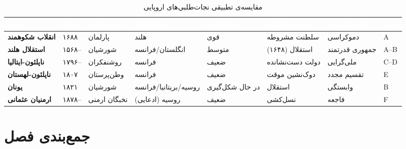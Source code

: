 \begin{landscape}
\begin{table}[htbp]
\centering
\caption{مقایسه‌ی تطبیقی نجات‌طلبی‌های اروپایی}\label{tab:ch08-european-comparative}
\begin{adjustbox}{max width=\linewidth}
\begin{tabular}{
  >{\raggedleft\arraybackslash\bfseries\small}p{2.5cm}
  >{\raggedleft\arraybackslash\small}p{1.5cm}
  >{\raggedleft\arraybackslash\small}p{2cm}
  >{\raggedleft\arraybackslash\small}p{2cm}
  >{\raggedleft\arraybackslash\small}p{2cm}
  >{\raggedleft\arraybackslash\small}p{2.5cm}
  >{\raggedleft\arraybackslash\small}p{2cm}
  >{\raggedleft\arraybackslash\small}p{1.5cm}}
\toprule
\rowcolor{PrimaryDeep}
\textcolor{white}{مورد} &
\textcolor{white}{سال} &
\textcolor{white}{دعوت‌کننده} &
\textcolor{white}{مداخله‌گر} &
\textcolor{white}{نهاد داخلی} &
\textcolor{white}{نتیجه‌ی اصلی} &
\textcolor{white}{پیامد بلندمدت} &
\textcolor{white}{طیف} \\
\midrule

انقلاب شکوهمند &
۱۶۸۸ &
پارلمان &
هلند &
\cellcolor{BgSuccess}قوی &
سلطنت مشروطه &
دموکراسی &
A \\
\rowcolor{NeutralLight}
استقلال هلند &
۱۵۶۸– &
شورشیان &
انگلستان/فرانسه &
\cellcolor{BgWarm}متوسط &
استقلال (۱۶۴۸) &
جمهوری قدرتمند &
A–B \\
ناپلئون-ایتالیا &
۱۷۹۶– &
روشنفکران &
فرانسه &
\cellcolor{BgFail}ضعیف &
دولت دست‌نشانده &
ملی‌گرایی &
C–D \\
\rowcolor{NeutralLight}
ناپلئون-لهستان &
۱۸۰۷ &
وطن‌پرستان &
فرانسه &
\cellcolor{BgFail}ضعیف &
دوک‌نشین موقت &
تقسیم مجدد &
E \\
یونان &
۱۸۲۱ &
شورشیان &
روسیه/بریتانیا/فرانسه &
\cellcolor{BgWarm}در حال شکل‌گیری &
استقلال &
وابستگی &
B \\
\rowcolor{NeutralLight}
ارمنیان عثمانی &
۱۸۷۸– &
نخبگان ارمنی &
روسیه (ادعایی) &
\cellcolor{BgFail}ضعیف &
نسل‌کشی &
فاجعه &
F \\

\bottomrule
\end{tabular}
\end{adjustbox}
\end{table}
\end{landscape}

\section{جمع‌بندی فصل}
\label{sec:ch08-summary}

